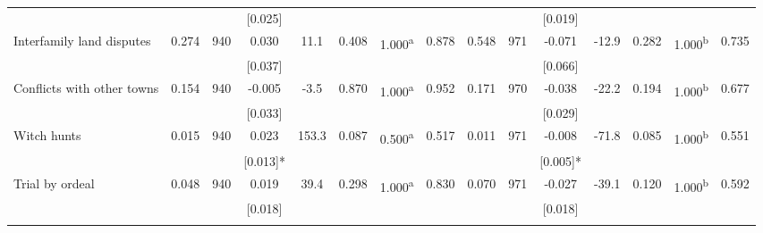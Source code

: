 \begin{tabular}{lcccccccccccccc}
 &  &  & [0.025] &  &  &  &  &  &  & [0.019] &  &  &  & \\
\quad Interfamily land disputes & 0.274 & 940 & 0.030 & 11.1 & 0.408 & 1.000\textsuperscript{a} & 0.878 & 0.548 & 971 & -0.071 & -12.9 & 0.282 & 1.000\textsuperscript{b} & 0.735\\
 &  &  & [0.037] &  &  &  &  &  &  & [0.066] &  &  &  & \\
\quad Conflicts with other towns & 0.154 & 940 & -0.005 & -3.5 & 0.870 & 1.000\textsuperscript{a} & 0.952 & 0.171 & 970 & -0.038 & -22.2 & 0.194 & 1.000\textsuperscript{b} & 0.677\\
 &  &  & [0.033] &  &  &  &  &  &  & [0.029] &  &  &  & \\
\quad Witch hunts & 0.015 & 940 & 0.023 & 153.3 & 0.087 & 0.500\textsuperscript{a} & 0.517 & 0.011 & 971 & -0.008 & -71.8 & 0.085 & 1.000\textsuperscript{b} & 0.551\\
 &  &  & [0.013]* &  &  &  &  &  &  & [0.005]* &  &  &  & \\
\quad Trial by ordeal & 0.048 & 940 & 0.019 & 39.4 & 0.298 & 1.000\textsuperscript{a} & 0.830 & 0.070 & 971 & -0.027 & -39.1 & 0.120 & 1.000\textsuperscript{b} & 0.592\\
 &  &  & [0.018] &  &  &  &  &  &  & [0.018] &  &  &  & \\
\noalign{\smallskip}\hline\end{tabular}
